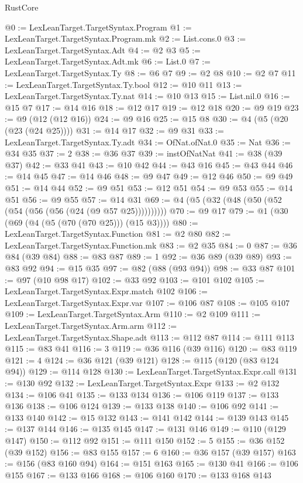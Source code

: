 \begin{lexlean}{RustCore}
\begin{coremodule}
@0 := LexLeanTarget.TargetSyntax.Program
@1 := LexLeanTarget.TargetSyntax.Program.mk
@2 := List.cons.{0}
@3 := LexLeanTarget.TargetSyntax.Adt
@4 := @2 @3
@5 := LexLeanTarget.TargetSyntax.Adt.mk
@6 := List.{0}
@7 := LexLeanTarget.TargetSyntax.Ty
@8 := @6 @7
@9 := @2 @8
@10 := @2 @7
@11 := LexLeanTarget.TargetSyntax.Ty.bool
@12 := @10 @11
@13 := LexLeanTarget.TargetSyntax.Ty.nat
@14 := @10 @13
@15 := List.nil.{0}
@16 := @15 @7
@17 := @14 @16
@18 := @12 @17
@19 := @12 @18
@20 := @9 @19
@23 := @9 (@12 (@12 @16))
@24 := @9 @16
@25 := @15 @8
@30 := @4 (@5 (@20 (@23 (@24 @25))))
@31 := @14 @17
@32 := @9 @31
@33 := LexLeanTarget.TargetSyntax.Ty.adt
@34 := OfNat.ofNat.{0}
@35 := Nat
@36 := @34 @35
@37 := 2
@38 := @36 @37
@39 := instOfNatNat
@41 := @38 (@39 @37)
@42 := @33 @41
@43 := @10 @42
@44 := @43 @16
@45 := @43 @44
@46 := @14 @45
@47 := @14 @46
@48 := @9 @47
@49 := @12 @46
@50 := @9 @49
@51 := @14 @44
@52 := @9 @51
@53 := @12 @51
@54 := @9 @53
@55 := @14 @51
@56 := @9 @55
@57 := @14 @31
@69 := @4 (@5 (@32 (@48 (@50 (@52 (@54 (@56 (@56 (@24 (@9 @57 @25))))))))))
@70 := @9 @17
@79 := @1 (@30 (@69 (@4 (@5 (@70 (@70 @25))) (@15 @3))))
@80 := LexLeanTarget.TargetSyntax.Function
@81 := @2 @80
@82 := LexLeanTarget.TargetSyntax.Function.mk
@83 := @2 @35
@84 := 0
@87 := @36 @84 (@39 @84)
@88 := @83 @87
@89 := 1
@92 := @36 @89 (@39 @89)
@93 := @83 @92
@94 := @15 @35
@97 := @82 (@88 (@93 @94))
@98 := @33 @87
@101 := @97 (@10 @98 @17)
@102 := @33 @92
@103 := @101 @102
@105 := LexLeanTarget.TargetSyntax.Expr.match @102
@106 := LexLeanTarget.TargetSyntax.Expr.var
@107 := @106 @87
@108 := @105 @107
@109 := LexLeanTarget.TargetSyntax.Arm
@110 := @2 @109
@111 := LexLeanTarget.TargetSyntax.Arm.arm
@112 := LexLeanTarget.TargetSyntax.Shape.adt
@113 := @112 @87
@114 := @111 @113
@115 := @83 @41
@116 := 3
@119 := @36 @116 (@39 @116)
@120 := @83 @119
@121 := 4
@124 := @36 @121 (@39 @121)
@128 := @115 (@120 (@83 @124 @94))
@129 := @114 @128
@130 := LexLeanTarget.TargetSyntax.Expr.call
@131 := @130 @92
@132 := LexLeanTarget.TargetSyntax.Expr
@133 := @2 @132
@134 := @106 @41
@135 := @133 @134
@136 := @106 @119
@137 := @133 @136
@138 := @106 @124
@139 := @133 @138
@140 := @106 @92
@141 := @133 @140
@142 := @15 @132
@143 := @141 @142
@144 := @139 @143
@145 := @137 @144
@146 := @135 @145
@147 := @131 @146
@149 := @110 (@129 @147)
@150 := @112 @92
@151 := @111 @150
@152 := 5
@155 := @36 @152 (@39 @152)
@156 := @83 @155
@157 := 6
@160 := @36 @157 (@39 @157)
@163 := @156 (@83 @160 @94)
@164 := @151 @163
@165 := @130 @41
@166 := @106 @155
@167 := @133 @166
@168 := @106 @160
@170 := @133 @168 @143

\end{coremodule}
\end{lexlean}
